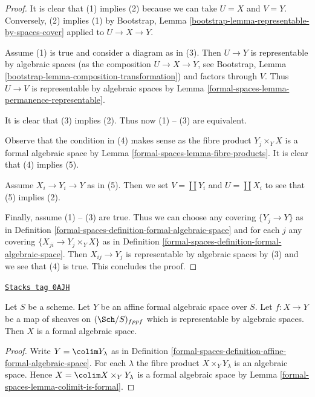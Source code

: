 \begin{proof}
It is clear that (1) implies (2) because we can take $U = X$ and $V = Y$.
Conversely, (2) implies (1) by
Bootstrap, Lemma \ref{bootstrap-lemma-representable-by-spaces-cover}
applied to $U \to X \to Y$.

\medskip\noindent
Assume (1) is true and consider a diagram as in (3).
Then $U \to Y$ is representable by algebraic spaces
(as the composition $U \to X \to Y$, see
Bootstrap, Lemma \ref{bootstrap-lemma-composition-transformation})
and factors through $V$. Thus $U \to V$ is representable by
algebraic spaces by Lemma \ref{formal-spaces-lemma-permanence-representable}.

\medskip\noindent
It is clear that (3) implies (2). Thus now (1) -- (3) are equivalent.

\medskip\noindent
Observe that the condition in (4) makes sense as the fibre product
$Y_j \times_Y X$ is a formal algebraic space by
Lemma \ref{formal-spaces-lemma-fibre-products}.
It is clear that (4) implies (5).

\medskip\noindent
Assume $X_i \to Y_i \to Y$ as in (5). Then we set
$V = \coprod Y_i$ and $U = \coprod X_i$ to see that
(5) implies (2).

\medskip\noindent
Finally, assume (1) -- (3) are true.
Thus we can choose any covering $\{Y_j \to Y\}$ as in
Definition \ref{formal-spaces-definition-formal-algebraic-space}
and for each $j$ any covering $\{X_{ji} \to Y_j \times_Y X\}$ as in
Definition \ref{formal-spaces-definition-formal-algebraic-space}.
Then $X_{ij} \to Y_j$ is representable by algebraic spaces by (3)
and we see that (4) is true. This concludes the proof.
\end{proof}

\begin{lemma}
\label{formal-spaces-lemma-algebraic-space-over-affine-formal}
\href{https://stacks.math.columbia.edu/tag/0AJH}{\texttt{Stacks tag 0AJH}}

Let $S$ be a scheme. Let $Y$ be an affine formal algebraic space over $S$.
Let $f : X \to Y$ be a map of sheaves on $(\Sch/S)_{fppf}$ which is
representable by algebraic spaces. Then $X$ is a formal
algebraic space.
\end{lemma}

\begin{proof}
Write $Y = \colim Y_\lambda$ as in
Definition \ref{formal-spaces-definition-affine-formal-algebraic-space}.
For each $\lambda$ the fibre product
$X \times_Y Y_\lambda$ is an algebraic space.
Hence $X = \colim X \times_Y Y_\lambda$ is a formal
algebraic space by Lemma \ref{formal-spaces-lemma-colimit-is-formal}.
\end{proof}

